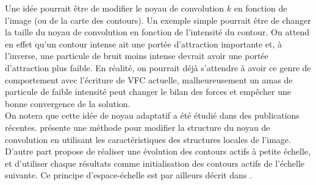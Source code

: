 Une idée pourrait être de modifier le noyau de convolution $k$ en fonction de l'image (ou de la carte des contours). Un exemple simple pourrait être de changer la taille du noyau de convolution en fonction de l'intensité du contour. On attend en effet qu'un contour intense ait une portée d'attraction importante et, à l'inverse, une particule de bruit moins intense devrait avoir une portée d'attraction plus faible. En réalité, on pourrait déjà s'attendre à avoir ce genre de comportement avec l'écriture de VFC actuelle, malheureusement un amas de particule de faible intensité peut changer le bilan des forces et empêcher une bonne convergence de la solution.\\

On notera que cette idée de noyau adaptatif a été étudié dans des publications récentes. \cite{tvfc} présente une méthode pour modifier la structure du noyau de convolution en utilisant les caractéristiques des structures locales de l'image. D'autre part \cite{mtvfc} propose de réaliser une évolution des contours actifs à petite échelle, et d'utiliser chaque résultats comme initialisation des contours actifs de l'échelle suivante. Ce principe d'espace-échelle est par ailleurs décrit dans \cite{mvfc}.
